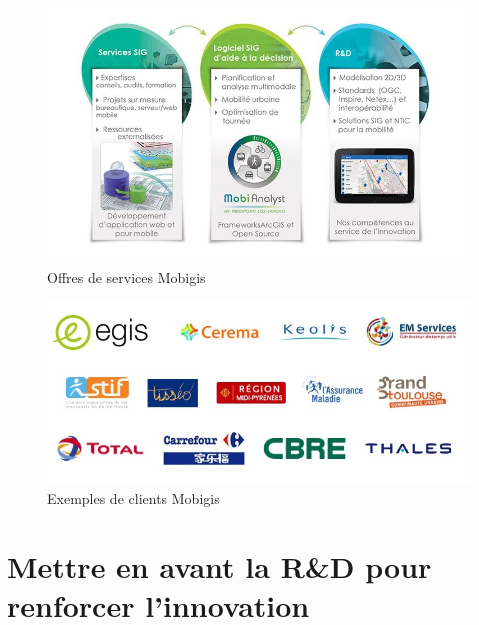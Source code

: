 \begin{figure}[t]\label{fig1}
\centering
\includegraphics[width=12cm]{images/fig1_solutionsMobigis.JPG}
\caption{Offres de services Mobigis}
\end{figure} 

\begin{figure}[t]\label{fig2}
\centering
\includegraphics[width=12cm]{images/fig2_referencesMobigis.JPG}
\caption{Exemples de clients Mobigis}
\end{figure} 

\section{Mettre en avant la R\&D pour renforcer l'innovation}

